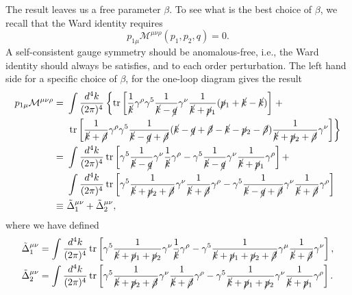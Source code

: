 \documentclass[aps,prb,superscriptaddress,nofootinbib]{revtex4}
\def \tr{\operatorname{tr}}
\begin{document}
The result leaves us a free parameter $\beta$.
To see what is the best choice of $\beta$, we recall that the Ward identity requires
\begin{equation}
	p_{1\mu} \mathcal{M}^{\mu\nu\rho}(p_1,p_2,q) = 0.
\end{equation}
A self-consistent gauge symmetry should be anomalous-free, i.e., the Ward identity should always be satisfies, and to each order perturbation. 
The left hand side for a specific choice of $\beta$, for the one-loop diagram gives the result
\begin{equation}
\begin{aligned}
	p_{1\mu} \mathcal{M}^{\mu\nu\rho} 
	=&\ \int \frac{d^{4} k}{(2 \pi)^{4}} \left\{\tr\left[\frac{1}{\cancel k} \gamma^\rho \gamma^{5} \frac{1}{\cancel k-\cancel q} \gamma^{\nu} \frac{1}{\cancel k+\cancel p_{1}} (\cancel p_1 +\cancel k -\cancel k) \right] \right. + \\
	&\ \left.\tr\left[\frac{1}{\cancel k +\cancel \beta} \gamma^\rho \gamma^{5} \frac{1}{\cancel k-\cancel q+\cancel\beta} (\cancel k -\cancel q +\cancel \beta -\cancel k -\cancel p_2-\cancel \beta) \frac{1}{\cancel k+\cancel p_{2}+\cancel \beta} \gamma^\nu \right]\right\} \\
	=&\ \int \frac{d^{4} k}{(2 \pi)^{4}} \tr\left[\gamma^{5} \frac{1}{\cancel k - \cancel q} \gamma^\nu \frac{1}{\cancel k} \gamma^{\rho} - \gamma^{5} \frac{1}{\cancel k - \cancel q} \gamma^\nu \frac{1}{\cancel k+\cancel p_1} \gamma^{\rho}\right]+ \\
	&\ \int \frac{d^{4} k}{(2 \pi)^{4}} \tr\left[\gamma^{5} \frac{1}{\cancel k+\cancel p_2+\cancel\beta} \gamma^{\nu} \frac{1}{\cancel k+\cancel \beta} \gamma^\rho -\gamma^5\frac{1}{\cancel k-\cancel q+\cancel\beta}\gamma^\nu\frac{1}{\cancel k+\cancel\beta}\gamma^\rho\right] \\
	\equiv &\ \tilde\Delta^{\mu\nu}_1 + \tilde\Delta^{\mu\nu}_2,
\end{aligned}
\end{equation}
where we have defined
\begin{equation}
\begin{aligned}
	\tilde\Delta^{\mu\nu}_1 &= \int \frac{d^{4} k}{(2 \pi)^{4}} \tr\left[
		\gamma^{5} \frac{1}{\cancel k + \cancel p_1 +\cancel p_2} \gamma^\nu \frac{1}{\cancel k} \gamma^{\rho} -
		\gamma^5\frac{1}{\cancel k+ \cancel p_1 +\cancel p_2+\cancel\beta}\gamma^\mu\frac{1}{\cancel k+\cancel\beta}\gamma^\nu 
	\right], \\
	\tilde\Delta^{\mu\nu}_2 &= \int \frac{d^{4} k}{(2 \pi)^{4}} \tr\left[
		\gamma^{5} \frac{1}{\cancel k+\cancel p_2+\cancel\beta} \gamma^{\nu} \frac{1}{\cancel k+\cancel \beta} \gamma^\rho -
		\gamma^{5} \frac{1}{\cancel k + \cancel p_1+\cancel p_2} \gamma^\nu \frac{1}{\cancel k+\cancel p_1} \gamma^{\rho}
	\right].
\end{aligned}
\end{equation}
\end{document}
